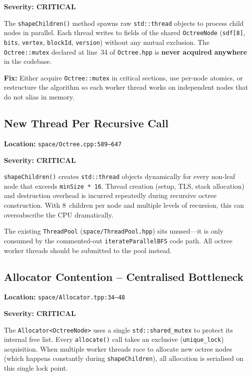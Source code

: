 \documentclass[a4paper,11pt]{article}
\begin{document}
\textbf{Severity: CRITICAL}

The \texttt{shapeChildren()} method spawns raw \texttt{std::thread} objects to
process child nodes in parallel. Each thread writes to fields of the shared
\texttt{OctreeNode} (\texttt{sdf[8]}, \texttt{bits}, \texttt{vertex},
\texttt{blockId}, \texttt{version}) without any mutual exclusion. The
\texttt{Octree::mutex} declared at line~34 of \texttt{Octree.hpp} is
\textbf{never acquired anywhere} in the codebase.

\textbf{Fix:} Either acquire \texttt{Octree::mutex} in critical sections, use
per-node atomics, or restructure the algorithm so each worker thread works on
independent nodes that do not alias in memory.

\subsection{New Thread Per Recursive Call}

\textbf{Location:} \texttt{space/Octree.cpp:589--647}

\textbf{Severity: CRITICAL}

\texttt{shapeChildren()} creates \texttt{std::thread} objects dynamically for
every non-leaf node that exceeds \texttt{minSize * 16}. Thread creation
(setup, TLS, stack allocation) and destruction overhead is incurred
repeatedly during recursive octree construction. With 8~children per node
and multiple levels of recursion, this can oversubscribe the CPU
dramatically.

The existing \texttt{ThreadPool} (\texttt{space/ThreadPool.hpp}) sits
unused---it is only consumed by the commented-out
\texttt{iterateParallelBFS} code path. All octree worker threads should be
submitted to the pool instead.

\subsection{Allocator Contention -- Centralised Bottleneck}

\textbf{Location:} \texttt{space/Allocator.tpp:34--48}

\textbf{Severity: CRITICAL}

The \texttt{Allocator<OctreeNode>} uses a single \texttt{std::shared\_mutex}
to protect its internal free list. Every \texttt{allocate()} call takes an
exclusive (\texttt{unique\_lock}) acquisition. When multiple worker threads
race to allocate new octree nodes (which happens constantly during
\texttt{shapeChildren}), all allocation is serialised on this single lock
point.
\end{document}
